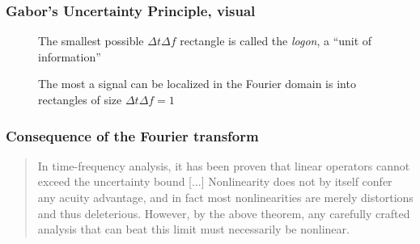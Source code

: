 \documentclass{beamer}
\begin{document}
\begin{frame}
	\frametitle{Gabor's Uncertainty Principle, visual}
	\begin{figure}
		\centering
		\hspace{0.35em}
		\caption{The most a signal can be localized in the Fourier domain is into rectangles of size $\Delta t\Delta f = 1$}
	The smallest possible $\Delta t \Delta f$ rectangle is called the \textit{logon}, a ``unit of information''
	\end{figure}
\end{frame}

\begin{frame}
	\frametitle{Consequence of the Fourier transform}
	\begin{quote}
	In time-frequency analysis, it has been proven that linear operators cannot exceed the uncertainty bound [...] Nonlinearity does not by itself confer any acuity advantage, and in fact most nonlinearities are merely distortions and thus deleterious. However, by the above theorem, any carefully crafted analysis that can beat this limit must necessarily be nonlinear.
	\end{quote}
\end{frame}
\end{document}
